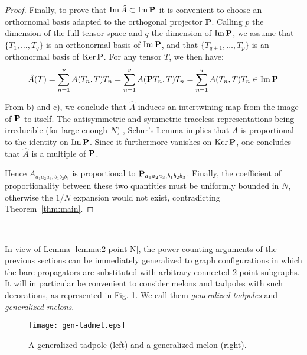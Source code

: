 \documentclass[10pt]{article}
\theoremstyle{plain}
\theoremstyle{definition}
\newcommand{\bP}{ {\bf P} }
\begin{document}
\begin{proof}
Finally, to prove that $\mathrm{Im} \, \hat{A} \subset \mathrm{Im} \, {\bf P}$ it is convenient to choose an orthornomal basis adapted to the orthogonal projector $\mathbf{P}$. Calling $p$ the dimension of the full tensor space and $q$ the dimension of $\mathrm{Im} \, {\bf P}$, we assume that $\{ T_1 ,\ldots , T_q \}$ is an orthonormal basis of $\mathrm{Im} \, {\bf P}$, and that $\{ T_{q+1} ,\ldots , T_p \}$ is an orthonormal basis of $\mathrm{Ker} \, {\bf P}$. For any tensor $T$, we then have:
$$
\hat{A}(T) = \sum_{n=1}^p A(T_n , T) T_n = \sum_{n=1}^p A({\bf P} T_n , T) T_n = \sum_{n=1}^q A( T_n , T) T_n \in \mathrm{Im} \, {\bf P}
$$  

From b) and c), we conclude that $\hat{A}$ induces an intertwining map from the image of ${\bf P}$ to itself. The antisymmetric and symmetric traceless representations being irreducible (for large enough $N$) \cite{weyl1946, hamermesh}, Schur's Lemma implies that $\hat{A}$ is proportional to the identity on $\mathrm{Im} \, {\bf P}$. Since it furthermore vanishes on $\mathrm{Ker} \, {\bf P}$, one concludes that $\hat{A}$ is a multiple of ${\bf P}$. 

Hence $A_{a_1 a_2 a_3 , b_1 b_2 b_3}$ is proportional to ${\bf P}_{a_1 a_2 a_3, b_1 b_2 b_3}$. Finally, the coefficient of proportionality between these two quantities must be uniformly bounded in $N$, otherwise the $1/N$ expansion would not exist, contradicting Theorem~\ref{thm:main}.  
\end{proof}

\

In view of Lemma \ref{lemma:2-point-N}, the power-counting arguments of the previous sections can be immediately generalized to graph configurations in which the bare propagators are substituted with arbitrary connected $2$-point subgraphs. 
It will in particular be convenient to consider melons and tadpoles with such decorations, as represented in Fig. \ref{fig:gen-tadmel}. We call them \emph{generalized tadpoles} and \emph{generalized melons}.  
\begin{figure}[htb]
 \begin{center}
 \texttt{[image: gen-tadmel.eps]}  
 \caption{A generalized tadpole (left) and a generalized melon (right).} \label{fig:gen-tadmel}
 \end{center}
 \end{figure}

\
\end{document}
